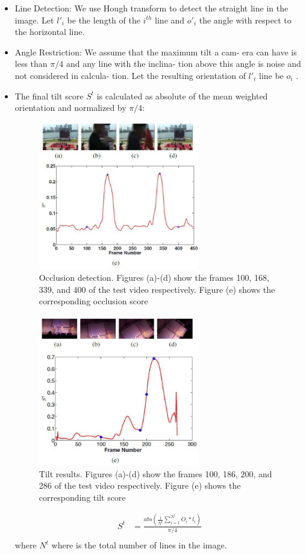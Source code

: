 \documentclass{sig-alternate-05-2015}
\begin{document}
\begin{itemize}
\item Line Detection: We use Hough transform to detect the straight
line in the image. Let  $l'_i$ be the length of the $i^{th}$ line and  $o'_i$ 
the angle with respect to the horizontal line.
\item Angle Restriction: We assume that the maximum tilt a cam-
era can have is less than $\pi/4$ and any line with the inclina-
tion above this angle is noise and not considered in calcula-
tion. Let the resulting orientation of $l'_i$ line be $o_i$ . 
\item The final tilt score $S^t$ is calculated as absolute of the mean
weighted orientation and normalized by $\pi/4$:


\begin{figure}
\centering
\includegraphics[width=70mm]{video.pdf}
\caption{Occlusion detection. Figures (a)-(d) show the frames
100, 168, 339, and 400 of the test video respectively. Figure (e)
shows the corresponding occlusion score}
\end{figure}
\begin{figure}
\centering
\includegraphics[width=70mm]{video_2.pdf}
\caption{Tilt results. Figures (a)-(d) show the frames 100, 186,
200, and 286 of the test video respectively. Figure (e) shows the
corresponding tilt score}
\end{figure}
\begin{align*}
S^t&= \frac{abs(\frac{1}{N^t}\sum_{i=1}^{N^t} O_i*l_i)}{\pi/4}\\
\end{align*}
where $N^t$ where is the total number of lines in the image.


\end{itemize}
\end{document}

